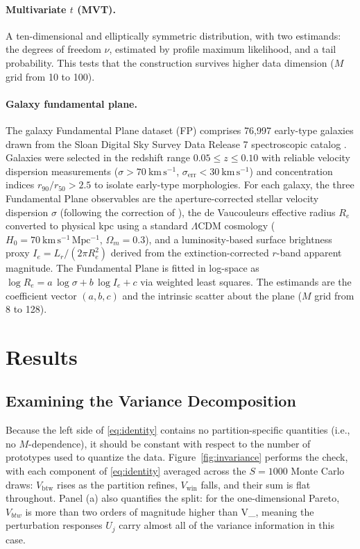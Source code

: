 \documentclass[runningheads]{llncs}
\newcommand{\Vcell}{V_{\mathrm{btw}}}
\newcommand{\Vwithin}{V_{\mathrm{win}}}
\begin{document}
\paragraph{Multivariate $t$ (MVT).} A ten-dimensional and elliptically symmetric distribution, with two estimands: the degrees of freedom $\nu$, estimated by profile maximum likelihood, and a tail probability. This tests that the construction survives higher data dimension ($M$ grid from 10 to 100).

\paragraph{Galaxy fundamental plane.} The galaxy Fundamental Plane dataset (FP) comprises 76{,}997 early-type galaxies drawn from the Sloan Digital Sky Survey Data Release 7 spectroscopic catalog \cite{abazajian2009}. Galaxies were selected in the redshift range $0.05 \le z \le 0.10$ with reliable velocity dispersion measurements ($\sigma > 70~\mathrm{km\,s^{-1}}$, $\sigma_{\mathrm{err}} < 30~\mathrm{km\,s^{-1}}$) and concentration indices $r_{90}/r_{50} > 2.5$ to isolate early-type morphologies. For each galaxy, the three Fundamental Plane observables are the aperture-corrected stellar velocity dispersion $\sigma$ (following the correction of \cite{jorgensen1995}), the de Vaucouleurs effective radius $R_e$ converted to physical kpc using a standard $\Lambda$CDM cosmology ($H_0 = 70~\mathrm{km\,s^{-1}\,Mpc^{-1}}$, $\Omega_m = 0.3$), and a luminosity-based surface brightness proxy $I_e = L_r/(2\pi R_e^2)$ derived from the extinction-corrected $r$-band apparent magnitude. The Fundamental Plane is fitted in log-space as $\log R_e = a\,\log\sigma + b\,\log I_e + c$ via weighted least squares. The estimands are the coefficient vector $(a,b,c)$ and the intrinsic scatter about the plane ($M$ grid from 8 to 128).


\section{Results}\label{sec:results}

\subsection{Examining the Variance Decomposition}\label{sec:res-valid}

Because the left side of \eqref{eq:identity} contains no partition-specific quantities (i.e., no $M$-dependence), it should be constant with respect to the number of prototypes used to quantize the data. Figure~\ref{fig:invariance} performs the check, with each component of \eqref{eq:identity} averaged across the $S = 1000$ Monte Carlo draws: $\Vcell$ rises as the partition refines, $\Vwithin$ falls, and their sum is flat throughout. Panel (a) also quantifies the split: for the one-dimensional Pareto, $V_{btw}$ is more than two orders of magnitude higher than \Vwithin, meaning the perturbation responses $U_j$ carry almost all of the variance information in this case. 
\end{document}
